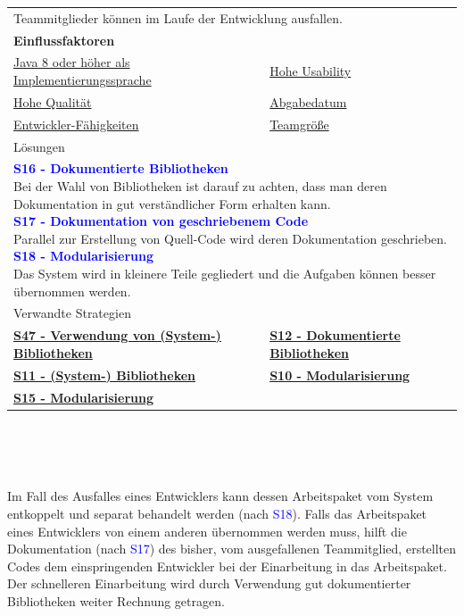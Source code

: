 \documentclass[enabledeprecatedfontcommands,fontsize=11pt,paper=a4,twoside]{scrartcl}
\newcounter{one}
\newcommand{\cb}[1]{{\textcolor{blue}{#1}}}
\begin{document}
\begin{tabular} {|p{8cm} p{8cm}|}
	\hline
	\rowcolor{prob}\multicolumn{2}{|l|}{\parbox{16cm}{\textbf{06: Ausfallende Entwickler}}} \\  \hline\hline 
	\multicolumn{2}{|l|}{\parbox{16cm}{Teammitglieder können im Laufe der Entwicklung ausfallen.}}\rule{0pt}{1ex}\\ \hline
	\multicolumn{2}{|l|}{\textbf{Einflussfaktoren}}\\
	\hyperlink{b}{Java 8 oder höher als Implementierungssprache} &
	\hyperlink {g}{Hohe Usability}\\
	\hyperlink {h}{Hohe Qualität}&
	\hyperlink {uu}{Abgabedatum} \\
	\hyperlink {vv}{Entwickler-Fähigkeiten} &
	\hyperlink {xx}{Teamgröße} 
	\\ \hline
	\multicolumn{2}{|l|}{Lösungen} \\
	\multicolumn{2}{|l|}{\parbox{16cm}{
			\textbf{\cb{\hypertarget{ddd}{S16 - Dokumentierte Bibliotheken}}}\\
			Bei der Wahl von Bibliotheken ist darauf zu achten, dass man deren Dokumentation in gut verständlicher Form erhalten kann. \\
			\textbf{\cb{\hypertarget{dokuvongeschriebenemcode}{S17 - Dokumentation von geschriebenem Code}}}\\
			Parallel zur Erstellung von Quell-Code wird deren Dokumentation geschrieben.\\
			\textbf{\cb{\hypertarget{aacc}{S18 - Modularisierung}}} \\
			Das System wird in kleinere Teile gegliedert und die Aufgaben können besser übernommen werden.
	}}\\ [4ex] \hline
	\multicolumn{2}{|l|}{Verwandte Strategien} \\
	\textbf{\hyperlink {qqq}{S47 - Verwendung von (System-) Bibliotheken}} & 
	\textbf{\hyperlink {aaaf}{S12 - Dokumentierte Bibliotheken}} \\
	\textbf{\hyperlink {ccc}{S11 - (System-) Bibliotheken}} &
	\textbf{\hyperlink{aadd}{S10 - Modularisierung}}\\
	\textbf{\hyperlink{aabb}{S15 - Modularisierung}} &
	\\\hline
\end{tabular}\\ \\ \\
\begin{onehalfspace}
	Im Fall des Ausfalles eines Entwicklers kann dessen Arbeitspaket vom System entkoppelt und separat behandelt werden (nach \cb{S18}). Falls das Arbeitspaket eines Entwicklers von einem anderen übernommen werden muss, hilft die Dokumentation (nach \cb{S17}) des bisher, vom ausgefallenen Teammitglied, erstellten Codes dem einspringenden Entwickler bei der Einarbeitung in das Arbeitspaket. Der schnelleren Einarbeitung wird durch Verwendung gut dokumentierter Bibliotheken weiter Rechnung getragen.
\end{onehalfspace}
\end{document}
